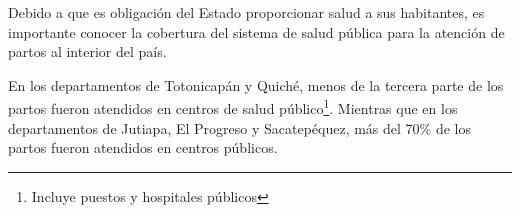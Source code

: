 Debido a que es obligación del Estado proporcionar salud a sus habitantes,  es importante conocer la cobertura del sistema de salud pública para la atención de partos al interior del país.  

En los departamentos de Totonicapán y Quiché, menos de la tercera parte de los partos fueron atendidos en centros de salud público\footnote{Incluye puestos y hospitales públicos}. Mientras que en los departamentos de Jutiapa, El Progreso y Sacatepéquez, más del 70\% de los partos fueron atendidos en centros públicos.  
